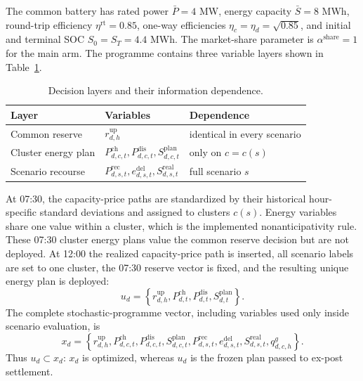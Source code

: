 \documentclass[11pt,a4paper]{article}
\begin{document}
The common battery has rated power $\bar P=4$ MW, energy capacity
$\bar S=8$ MWh, round-trip efficiency $\eta^{\mathrm{rt}}=0.85$, one-way
efficiencies $\eta_c=\eta_d=\sqrt{0.85}$, and initial and terminal SOC
$S_0=S_T=4.4$ MWh.  The market-share parameter is
$\alpha^{\mathrm{share}}=1$ for the main arm.  The programme contains three
variable layers shown in Table~\ref{tab:decision-layers}.

\begin{table}[htbp]
  \centering
  \small
  \caption{Decision layers and their information dependence.}
  \begin{tabular}{lll}
    \toprule
    Layer & Variables & Dependence \\
    \midrule
    Common reserve & $r^{\mathrm{up}}_{d,h}$ & identical in every scenario \\
    Cluster energy plan
      & $P^{\mathrm{ch}}_{d,c,t},P^{\mathrm{dis}}_{d,c,t},S^{\mathrm{plan}}_{d,c,t}$
      & only on $c=c(s)$ \\
    Scenario recourse
      & $P^{\mathrm{rec}}_{d,s,t},e^{\mathrm{del}}_{d,s,t},S^{\mathrm{real}}_{d,s,t}$
      & full scenario $s$ \\
    \bottomrule
  \end{tabular}
  \label{tab:decision-layers}
\end{table}

At 07:30, the capacity-price paths are standardized by their historical
hour-specific standard deviations and assigned to clusters $c(s)$.  Energy
variables share one value within a cluster, which is the implemented
nonanticipativity rule.  These 07:30 cluster energy plans value the common
reserve decision but are not deployed.  At 12:00 the realized capacity-price
path is inserted, all scenario labels are set to one cluster, the 07:30 reserve
vector is fixed, and the resulting unique energy plan is deployed:
\begin{equation}
  u_d=\left\{
  r^{\mathrm{up}}_{d,h},
  P^{\mathrm{ch}}_{d,t},P^{\mathrm{dis}}_{d,t},
  S^{\mathrm{plan}}_{d,t}
  \right\}.
  \label{eq:decision-vector}
\end{equation}
The complete stochastic-programme vector, including variables used only inside
scenario evaluation, is
\begin{equation}
  x_d=\left\{
  r^{\mathrm{up}}_{d,h},
  P^{\mathrm{ch}}_{d,c,t},P^{\mathrm{dis}}_{d,c,t},S^{\mathrm{plan}}_{d,c,t},
  P^{\mathrm{rec}}_{d,s,t},e^{\mathrm{del}}_{d,s,t},S^{\mathrm{real}}_{d,s,t},
  q^{g}_{d,c,h}
  \right\}.
  \label{eq:programme-vector}
\end{equation}
Thus $u_d\subset x_d$: $x_d$ is optimized, whereas $u_d$ is the frozen plan
passed to ex-post settlement.
\end{document}
